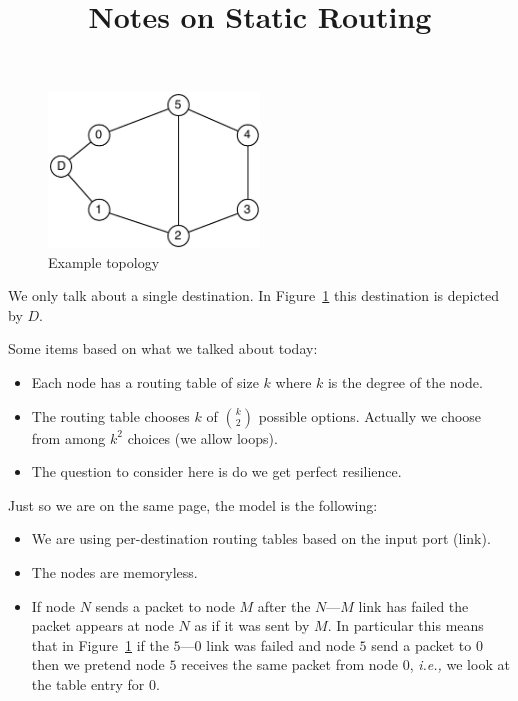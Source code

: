 \documentclass[letterpaper, 10pt]{article}
\title{Notes on Static Routing}
\date{}
\newcommand{\ie}{{\it i.e.,}\xspace}
\begin{document}
\maketitle
\thispagestyle{empty}
\begin{figure}[ht]
    \begin{center}
        \includegraphics[width=0.5\textwidth]{topo.pdf}
        \caption{Example topology}
        \label{fig:topology}
    \end{center}
\end{figure}

We only talk about a single destination. In Figure~\ref{fig:topology} this destination is depicted by $D$.

Some items based on what we talked about today:
\begin{itemize}
    \item Each node has a routing table of size $k$ where $k$ is the degree of the node.
    \item The routing table chooses $k$ of ${k \choose 2}$ possible options. Actually we choose from among $k^2$ choices
        (we allow loops). 
    \item The question to consider here is do we get perfect resilience.
\end{itemize}

Just so we are on the same page, the model is the following:
\begin{itemize}
    \item We are using per-destination routing tables based on the input port (link).
    \item The nodes are memoryless.
    \item If node $N$ sends a packet to node $M$ after the $N$---$M$ link has failed the packet appears at node $N$ as
        if it was sent by $M$. In particular this means that in Figure~\ref{fig:topology} if the $5$---$0$ link was
        failed and node $5$ send a packet to $0$ then we pretend node $5$ receives the same packet from node $0$, \ie we
        look at the table entry for $0$.
\end{itemize}
\end{document}
